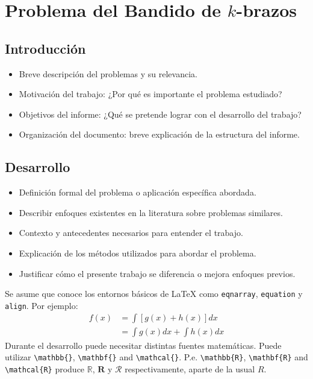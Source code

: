 
\chapter{Problema del Bandido de $k$-brazos}

\section{Introducción }

	\begin{itemize}
        \item Breve descripción del problemas y su relevancia.
        \item Motivación del trabajo: ¿Por qué es importante el problema estudiado?
        \item Objetivos del informe: ¿Qué se pretende lograr con el desarrollo del trabajo?
        \item Organización del documento: breve explicación de la estructura del informe.
    \end{itemize}

\section{Desarrollo}
	\begin{itemize}
        \item Definición formal del problema o aplicación específica abordada.
        \item Describir enfoques existentes en la literatura sobre problemas similares.
        \item Contexto y antecedentes necesarios para entender el trabajo.
        \item Explicación de los métodos utilizados para abordar el problema.
        \item Justificar cómo el presente trabajo se diferencia o mejora enfoques previos.
    \end{itemize}

Se asume que conoce los entornos básicos de \LaTeX\/ como \texttt{eqnarray}, \texttt{equation} y 
\texttt{align}. Por ejemplo:
\begin{align}
f(x) &= \int  [ g(x) +  h(x) ] dx  \nonumber \\
	 &= \int  g(x)dx + \int  h(x)  dx 
\end{align}
Durante el desarrollo puede necesitar distintas fuentes matemáticas. 
Puede utilizar \verb+\mathbb{}+, \verb+\mathbf{}+ and
\verb+\mathcal{}+. P.e.  \verb+\mathbb{R}+, \verb+\mathbf{R}+
and \verb+\mathcal{R}+ produce $\mathbb{R}$, $\mathbf{R}$ y $\mathcal{R}$
respectivamente, aparte de la usual $R$.


